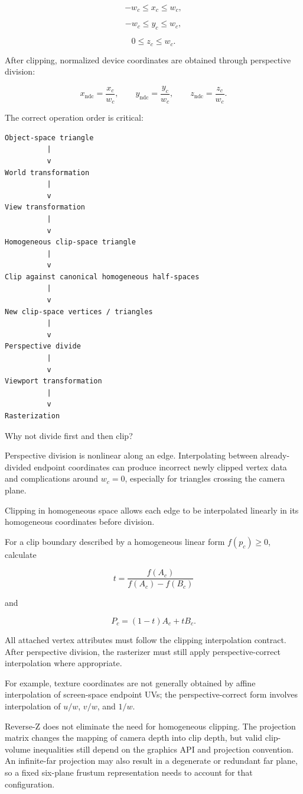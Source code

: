 \[
-w_c\le x_c\le w_c,
\]

\[
-w_c\le y_c\le w_c,
\]

\[
0\le z_c\le w_c.
\]

After clipping, normalized device coordinates are obtained through perspective division:

\[
x_{\text{ndc}}=\frac{x_c}{w_c},\qquad y_{\text{ndc}}=\frac{y_c}{w_c},\qquad z_{\text{ndc}}=\frac{z_c}{w_c}.
\]

The correct operation order is critical:

\begin{verbatim}
Object-space triangle
          |
          v
World transformation
          |
          v
View transformation
          |
          v
Homogeneous clip-space triangle
          |
          v
Clip against canonical homogeneous half-spaces
          |
          v
New clip-space vertices / triangles
          |
          v
Perspective divide
          |
          v
Viewport transformation
          |
          v
Rasterization
\end{verbatim}

Why not divide first and then clip?

Perspective division is nonlinear along an edge. Interpolating between already-divided endpoint coordinates can produce incorrect newly clipped vertex data and complications around \(w_c=0\), especially for triangles crossing the camera plane.

Clipping in homogeneous space allows each edge to be interpolated linearly in its homogeneous coordinates before division.

For a clip boundary described by a homogeneous linear form \(f(p_c)\ge0\), calculate

\[
t=\frac{f(A_c)}{f(A_c)-f(B_c)}
\]

and

\[
P_c=(1-t)A_c+tB_c.
\]

All attached vertex attributes must follow the clipping interpolation contract. After perspective division, the rasterizer must still apply perspective-correct interpolation where appropriate.

For example, texture coordinates are not generally obtained by affine interpolation of screen-space endpoint UVs; the perspective-correct form involves interpolation of \(u/w\), \(v/w\), and \(1/w\).

Reverse-Z does not eliminate the need for homogeneous clipping. The projection matrix changes the mapping of camera depth into clip depth, but valid clip-volume inequalities still depend on the graphics API and projection convention. An infinite-far projection may also result in a degenerate or redundant far plane, so a fixed six-plane frustum representation needs to account for that configuration.

